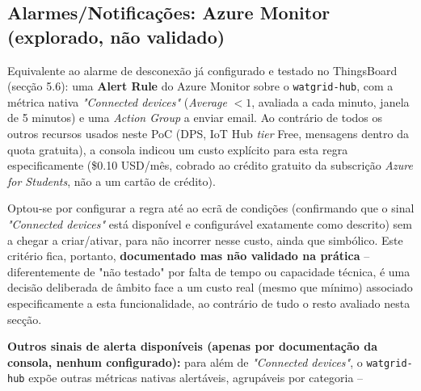 \documentclass[a4paper,12pt]{article}
\begin{document}
\subsection{Alarmes/Notificações: Azure Monitor (explorado, não validado)}
Equivalente ao alarme de desconexão já configurado e testado no ThingsBoard (secção 5.6): uma \textbf{Alert Rule} do Azure Monitor sobre o \texttt{watgrid-hub}, com a métrica nativa \textit{"Connected devices"} (\textit{Average} $<1$, avaliada a cada minuto, janela de 5 minutos) e uma \textit{Action Group} a enviar email. Ao contrário de todos os outros recursos usados neste PoC (DPS, IoT Hub \textit{tier} Free, mensagens dentro da quota gratuita), a consola indicou um custo explícito para esta regra especificamente (\$0.10 USD/mês, cobrado ao crédito gratuito da subscrição \textit{Azure for Students}, não a um cartão de crédito).

Optou-se por configurar a regra até ao ecrã de condições (confirmando que o sinal \textit{"Connected devices"} está disponível e configurável exatamente como descrito) sem a chegar a criar/ativar, para não incorrer nesse custo, ainda que simbólico. Este critério fica, portanto, \textbf{documentado mas não validado na prática} -- diferentemente de "não testado" por falta de tempo ou capacidade técnica, é uma decisão deliberada de âmbito face a um custo real (mesmo que mínimo) associado especificamente a esta funcionalidade, ao contrário de tudo o resto avaliado nesta secção.

\textbf{Outros sinais de alerta disponíveis (apenas por documentação da consola, nenhum configurado):} para além de \textit{"Connected devices"}, o \texttt{watgrid-hub} expõe outras métricas nativas alertáveis, agrupáveis por categoria --
\end{document}
